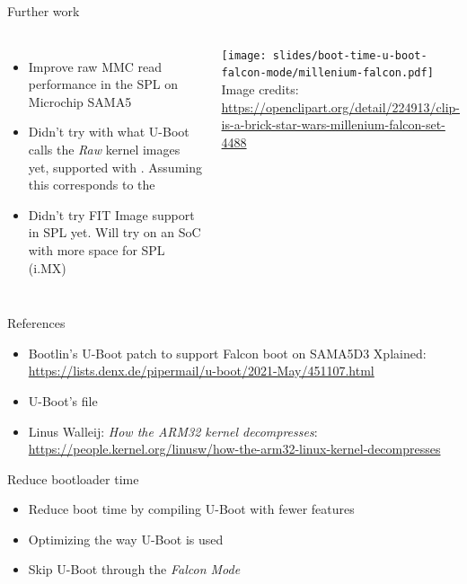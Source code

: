 \begin{frame}{Further work}
   \begin{columns}
   \begin{itemize}
      \item Improve raw MMC read performance in the SPL on Microchip SAMA5
      \item Didn't try with what U-Boot calls the {\em Raw} kernel
            images yet, supported with .
            Assuming this corresponds to the 
      \item Didn't try FIT Image support in SPL yet. Will try on an SoC
	    with more space for SPL (i.MX)
   \end{itemize}
    \begin{center}
     \vspace{1cm}
     \texttt{[image: slides/boot-time-u-boot-falcon-mode/millenium-falcon.pdf]}\\
     \vspace{1cm}
     \tiny Image credits:\\
     \url{https://openclipart.org/detail/224913/clip-is-a-brick-star-wars-millenium-falcon-set-4488}
    \end{center}
   \end{columns}
\end{frame}

\begin{frame}{References}
   \begin{itemize}
      \item Bootlin's U-Boot patch to support Falcon boot on SAMA5D3 Xplained:\\
	    \url{https://lists.denx.de/pipermail/u-boot/2021-May/451107.html}
      \item U-Boot's  file
      \item Linus Walleij: {\em How the ARM32 kernel decompresses}:\\
	    \small\url{https://people.kernel.org/linusw/how-the-arm32-linux-kernel-decompresses}
   \end{itemize}
\end{frame}

\setuplabframe
{Reduce bootloader time}
{
\begin{itemize}
\item Reduce boot time by compiling U-Boot with fewer features
\item Optimizing the way U-Boot is used
\item Skip U-Boot through the {\em Falcon Mode}
\end{itemize}
}

